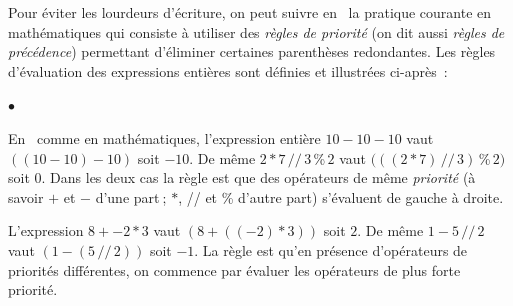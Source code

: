{\begin{minipage}{\myparboxwidth}
\indent Pour éviter les lourdeurs d'écriture, on peut suivre en \python\ la pratique courante en
mathématiques qui consiste à utiliser des {\em règles de priorité} (on dit aussi {\em règles
de précédence}) permettant d'éliminer
certaines parenthèses redondantes.  
Les règles d'évaluation des expressions entières sont
définies et illustrées ci-après~:
\begin{list}{$\scriptscriptstyle\bullet$}{
}
\item En \python\ comme en mathématiques, l'expression
entière $10 - 10 - 10$ vaut $((10 - 10) - 10)$ soit $-10$.  De même $ 2 \ast 7 \,/\!/
\, 3\,${\idt \%}$\, 2$ vaut $(((2 \ast 7) \,/\!/\, 3)\,${\idt \%}$\, 2)$ soit $0$. 
Dans les deux cas la règle est que des opérateurs de même {\em priorité} (à savoir $+$ et 
$-$ d'une part$\:$; $\ast$, {\idt //} et {\idt \%} d'autre part) s'évaluent de gauche à droite. 
\item L'expression $8 + - 2 \ast 3$ vaut $(8 + ((-2) \ast 3))$ soit $2$.  De même 
\hbox{$1 - 5\,/\!/\,2$}
vaut $(1 - (5\,/\!/\,2))$ soit $-1$. La règle est qu'en présence d'opérateurs de
priorités différentes, on commence par évaluer les opérateurs de plus forte priorité. 
\end{list}

\vspace{\abovedisplayskip}
\end{minipage}
}

